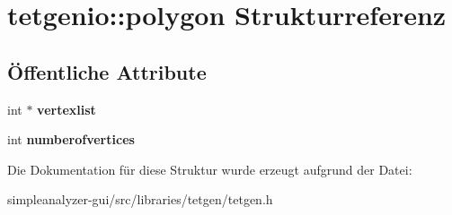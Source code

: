 \hypertarget{structtetgenio_1_1polygon}{\section{tetgenio\-:\-:polygon Strukturreferenz}
\label{structtetgenio_1_1polygon}
}
\subsection*{Öffentliche Attribute}
\begin{DoxyCompactItemize}
\item 
\hypertarget{structtetgenio_1_1polygon_a3cc2d3756bc093db5c252dd8f42a5001}{int $\ast$ {\bfseries vertexlist}}\label{structtetgenio_1_1polygon_a3cc2d3756bc093db5c252dd8f42a5001}

\item 
\hypertarget{structtetgenio_1_1polygon_a019f9c62f145cf7d85227f401fcdba38}{int {\bfseries numberofvertices}}\label{structtetgenio_1_1polygon_a019f9c62f145cf7d85227f401fcdba38}

\end{DoxyCompactItemize}


Die Dokumentation für diese Struktur wurde erzeugt aufgrund der Datei\-:\begin{DoxyCompactItemize}
\item 
simpleanalyzer-\/gui/src/libraries/tetgen/tetgen.\-h\end{DoxyCompactItemize}
